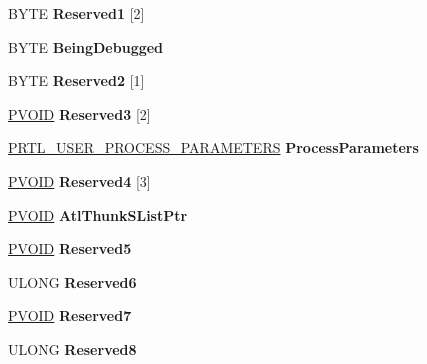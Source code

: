 \begin{DoxyCompactItemize}
B\+Y\+TE {\bfseries Reserved1} \mbox{[}2\mbox{]}
\item 
\mbox{\label{struct___p_e_b_a6a1be595a75834747b84156ad490ac34}} 
B\+Y\+TE {\bfseries Being\+Debugged}
\item 
\mbox{\label{struct___p_e_b_a631e09016e2625615dd0a4594fce4243}} 
B\+Y\+TE {\bfseries Reserved2} \mbox{[}1\mbox{]}
\item 
\mbox{\label{struct___p_e_b_aa942177e7ede75e22d65547069f9fd65}} 
\hyperlink{interfacevoid}{P\+V\+O\+ID} {\bfseries Reserved3} \mbox{[}2\mbox{]}
\item 
\mbox{\label{struct___p_e_b_a92dea8b624fff855a19206b16a642bc4}} 
\hyperlink{struct___r_t_l___u_s_e_r___p_r_o_c_e_s_s___p_a_r_a_m_e_t_e_r_s}{P\+R\+T\+L\+\_\+\+U\+S\+E\+R\+\_\+\+P\+R\+O\+C\+E\+S\+S\+\_\+\+P\+A\+R\+A\+M\+E\+T\+E\+RS} {\bfseries Process\+Parameters}
\item 
\mbox{\label{struct___p_e_b_aed325c76643d18f52ae84814caa260a7}} 
\hyperlink{interfacevoid}{P\+V\+O\+ID} {\bfseries Reserved4} \mbox{[}3\mbox{]}
\item 
\mbox{\label{struct___p_e_b_a8127e4ecb558be9dbe87f5cf0fa5a3c6}} 
\hyperlink{interfacevoid}{P\+V\+O\+ID} {\bfseries Atl\+Thunk\+S\+List\+Ptr}
\item 
\mbox{\label{struct___p_e_b_aa10791359946ea6dc5969af0713a9e58}} 
\hyperlink{interfacevoid}{P\+V\+O\+ID} {\bfseries Reserved5}
\item 
\mbox{\label{struct___p_e_b_a0fd21f246e503183cf00a819c1b3e6b3}} 
U\+L\+O\+NG {\bfseries Reserved6}
\item 
\mbox{\label{struct___p_e_b_ae698e186d9c018acb051723e5605fbb2}} 
\hyperlink{interfacevoid}{P\+V\+O\+ID} {\bfseries Reserved7}
\item 
\mbox{\label{struct___p_e_b_a016025a14d2afad8b8f2d90b8f87c580}} 
U\+L\+O\+NG {\bfseries Reserved8}
\item 
\mbox{\label{struct___p_e_b_ae179e65ab256a9f9093c5966c931c330}} 

\end{DoxyCompactItemize}
